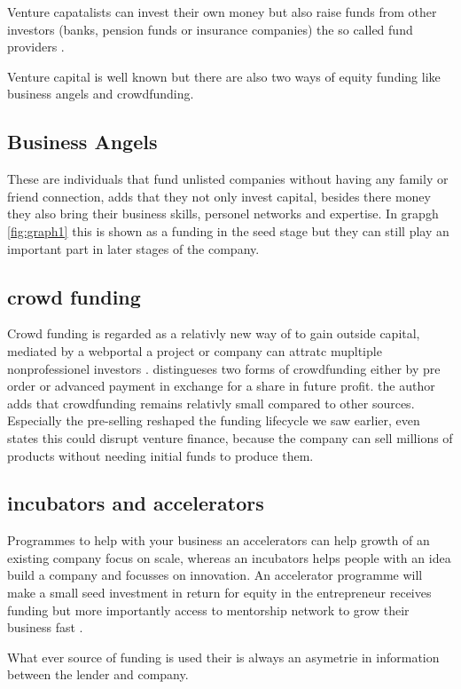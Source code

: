 \documentclass[a4paper, 11pt]{article}
\begin{document}
Venture capatalists can invest their own money but also raise funds from other investors (banks, pension funds or insurance companies) the so called fund providers \citep{casson2008oxford}.

Venture capital is well known but there are also two ways of equity funding like business angels and crowdfunding.

\subsection{Business Angels}
These are individuals that fund unlisted companies without having any family or friend connection, \citep{politis} adds that they not only invest capital, besides there money they also bring their business skills, personel networks and expertise. In grapgh \ref{fig:graph1} this is shown as a funding in the seed stage but they can still play an important part in later stages of the company.


\subsection{crowd funding}
Crowd funding is regarded as a relativly new way of to gain outside capital, mediated by a webportal a project or company can attratc mupltiple nonprofessionel investors \cite{TiddBessant}. \citep{belleflamme} distingueses two forms of crowdfunding either by pre order or advanced payment in exchange for a share in future profit. the author adds that crowdfunding  remains relativly small compared to other sources. Especially the pre-selling reshaped the funding lifecycle we saw earlier, \cite{bella} even states this could disrupt venture finance, because the company can sell millions of products without needing initial funds to produce them. 

\subsection{incubators and accelerators}
Programmes to help with your business an accelerators can help growth of an existing company focus on scale, whereas an incubators helps people with an idea build a company and focusses on innovation. An accelerator programme will make a small seed investment in return for equity in the entrepreneur receives funding but more importantly access to mentorship network to grow their business fast \citep{forrest}.

What ever source of funding is used their is always an asymetrie in information between the lender and company.
\end{document}
